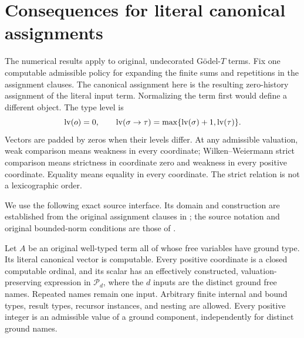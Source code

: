 \section{Consequences for literal canonical assignments}
\label{sec:source-applications}

The numerical results apply to original, undecorated G\"odel-$T$ terms.
Fix one computable admissible policy for expanding the finite sums and
repetitions in the assignment clauses.  The canonical assignment here is
the resulting zero-history assignment of the literal input term.
Normalizing the term first would define a different object.  The type
level is
\[
 \operatorname{lv}(o)=0,\qquad
 \operatorname{lv}(\sigma\to\tau)=\max\{\operatorname{lv}(\sigma)+1,\operatorname{lv}(\tau)\}.
\]
Vectors are padded by zeros when their levels differ.  At any admissible
valuation, weak comparison means weakness in every coordinate;
Wilken--Weiermann strict comparison means strictness in coordinate zero
and weakness in every positive coordinate.  Equality means equality in
every coordinate.  The strict relation is not a lexicographic order.

We use the following exact source interface.  Its domain and construction
are established from the original assignment clauses in
\cite[the canonical-source section]{wwcomparison}; the source notation
and original bounded-norm conditions are those of \cite{ww}.

\begin{proposition}
\label{prop:source-interface}
Let $A$ be an original well-typed term all of whose free variables have
ground type.  Its literal canonical vector is computable.  Every positive
coordinate is a closed computable ordinal, and its scalar has an
effectively constructed, valuation-preserving expression in
$\mathcal P_d$, where the $d$ inputs are the distinct ground free names.
Repeated names remain one input.  Arbitrary finite internal and bound
types, result types, recursor instances, and nesting are allowed.
Every positive integer is an admissible value of a ground component,
independently for distinct ground names.
\end{proposition}


